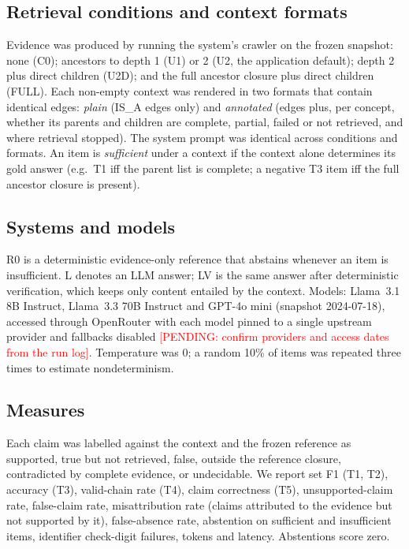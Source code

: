 \documentclass[11pt]{article}
\newcommand{\pending}[1]{\textcolor{red}{[PENDING: #1]}}
\begin{document}
\subsection{Retrieval conditions and context formats}
Evidence was produced by running the system's crawler on the frozen snapshot: none (C0); ancestors to depth 1 (U1) or 2 (U2, the application default); depth 2 plus direct children (U2D); and the full ancestor closure plus direct children (FULL). Each non-empty context was rendered in two formats that contain identical edges: \emph{plain} (IS\_A edges only) and \emph{annotated} (edges plus, per concept, whether its parents and children are complete, partial, failed or not retrieved, and where retrieval stopped). The system prompt was identical across conditions and formats. An item is \emph{sufficient} under a context if the context alone determines its gold answer (e.g.\ T1 iff the parent list is complete; a negative T3 item iff the full ancestor closure is present).

\subsection{Systems and models}
R0 is a deterministic evidence-only reference that abstains whenever an item is insufficient. L denotes an LLM answer; LV is the same answer after deterministic verification, which keeps only content entailed by the context. Models: Llama~3.1 8B Instruct, Llama~3.3 70B Instruct and GPT-4o mini (snapshot 2024-07-18), accessed through OpenRouter with each model pinned to a single upstream provider and fallbacks disabled \pending{confirm providers and access dates from the run log}. Temperature was 0; a random 10\% of items was repeated three times to estimate nondeterminism.

\subsection{Measures}
Each claim was labelled against the context and the frozen reference as supported, true but not retrieved, false, outside the reference closure, contradicted by complete evidence, or undecidable. We report set F1 (T1, T2), accuracy (T3), valid-chain rate (T4), claim correctness (T5), unsupported-claim rate, false-claim rate, misattribution rate (claims attributed to the evidence but not supported by it), false-absence rate, abstention on sufficient and insufficient items, identifier check-digit failures, tokens and latency. Abstentions score zero.
\end{document}
